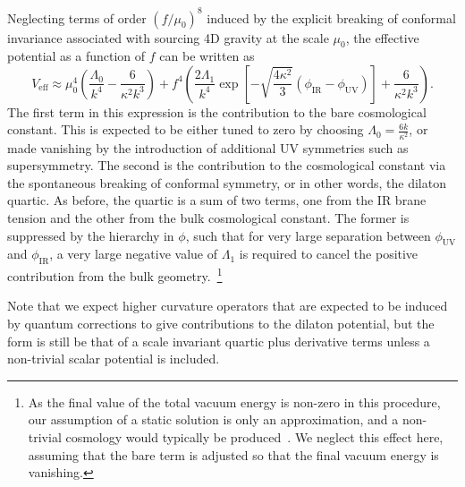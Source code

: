 \documentclass[12pt]{article}
\begin{document}
Neglecting terms of order $\left( f/\mu_0 \right)^8$ induced by the explicit breaking of conformal invariance associated with sourcing 4D gravity at the scale $\mu_0$, the effective potential as a function of $f$ can be written as
\begin{equation}
 V_\text{eff} \approx \mu_0^4 \left( \frac{\Lambda_0}{k^4}  - \frac{6}{\kappa^2k^3} \right)  +f^4 \left( \frac{2\Lambda_1}{k^4} \exp \left[ -\sqrt{\frac{4 \kappa^2}{3}} \left( \phi_\text{IR} - \phi_\text{UV} \right) \right] + \frac{6}{\kappa^2 k^3}   \right).
\end{equation}
The first term in this expression is the contribution to the bare cosmological constant.  This is expected to be either tuned to zero by choosing $\Lambda_0 = \frac{6k}{\kappa^2}$, or made vanishing by the introduction of additional UV symmetries such as supersymmetry.  The second is the contribution to the cosmological constant via the spontaneous breaking of conformal symmetry, or in other words, the dilaton quartic.   As before, the quartic is a sum of two terms, one from the IR brane tension and the other from the bulk cosmological constant.  The former is suppressed by the hierarchy in $\phi$, such that for very large separation between $\phi_\text{UV}$ and $\phi_\text{IR}$, a very large negative value of $\Lambda_1$ is required to cancel the positive contribution from the bulk geometry.~\footnote{As the final value of the total vacuum energy is non-zero in this procedure, our assumption of a static solution is only an approximation, and a non-trivial cosmology would typically be produced~\cite{Nihei:1999mt,Kaloper:1999sm}.  We neglect this effect here, assuming that the bare term is adjusted so that the final vacuum energy is vanishing.}


Note that we expect higher curvature operators that are expected to be induced by quantum corrections to give contributions to the dilaton potential, but the form is still be that of a scale invariant quartic plus derivative terms unless a non-trivial scalar potential is included.
\end{document}
